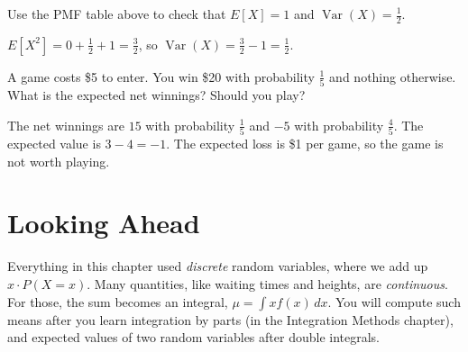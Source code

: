 \begin{Exercise}[label=rv3, title=Two coin flips]
Use the PMF table above to check that $E[X] = 1$ and $\operatorname{Var}(X) = \frac{1}{2}$.
\end{Exercise}
\begin{Answer}[ref=rv3]
$E[X^2] = 0 + \frac{1}{2} + 1 = \frac{3}{2}$, so $\operatorname{Var}(X) = \frac{3}{2} - 1 = \frac{1}{2}$.
\end{Answer}

\begin{Exercise}[label=rv4, title=Is the game worth playing?]
A game costs \$5 to enter. You win \$20 with probability $\frac{1}{5}$ and nothing
otherwise. What is the expected net winnings? Should you play?
\end{Exercise}
\begin{Answer}[ref=rv4]
The net winnings are $15$ with probability $\frac{1}{5}$ and $-5$ with probability
$\frac{4}{5}$. The expected value is $3 - 4 = -1$. The expected loss is \$1 per
game, so the game is not worth playing.
\end{Answer}

\section{Looking Ahead}
Everything in this chapter used \emph{discrete} random variables, where we
add up $x \cdot P(X = x)$. Many quantities, like waiting times and
heights, are \emph{continuous}. For those, the sum becomes an integral,
$\mu = \int x f(x)\,dx$. You will compute such means after you learn
integration by parts (in the Integration Methods chapter), and expected
values of two random variables after double integrals.
